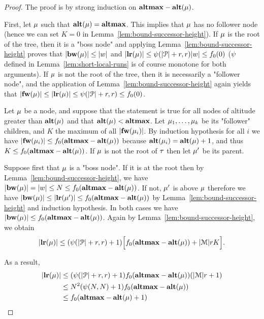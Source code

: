 \begin{proof}
	The proof is by strong induction on $\mathbf{altmax}-\mathbf{alt}(\mu)$.

	First, let $\mu$ such that $\mathbf{alt}(\mu) = \mathbf{altmax}$. This implies that $\mu$ has no follower node (hence we can set $K=0$ in Lemma~\ref{lem:bound-successor-height}).  If $\mu$ is the root of the tree, then it is a "boss node" and applying Lemma~\ref{lem:bound-successor-height} proves that $|\mathbf{bw}(\mu)| \leq |w|$ and $|\mathbf{lr}(\mu)| \leq \psi(|\mathcal{P}|+r,r) |w| \leq f_0(0)$ ($\psi$ defined in Lemma~\ref{lem:short-local-runs} is of course monotone for both arguments). If $\mu$ is not the root of the tree, then it is necessarily a "follower node", and the application of Lemma~\ref{lem:bound-successor-height} again yields that $|\mathbf{fw}(\mu)| \leq |\mathbf{lr}(\mu)| \leq \psi(|\mathcal{P}|+r,r) \leq f_0(0)$.   

	Let $\mu$ be a node, and suppose that the statement is true for all nodes of altitude greater than $\mathbf{alt}(\mu)$ and that $\mathbf{alt}(\mu) < \mathbf{altmax}$. 
	Let $\mu_1, \ldots, \mu_k$ be its "follower" children, and $K$ the maximum of all $|\mathbf{fw}(\mu_i)|$.  By induction hypothesis for all $i$ we have 
	$|\mathbf{fw}(\mu_i)| \leq f_0(\mathbf{altmax}-\mathbf{alt}(\mu))$ because $\mathbf{alt}(\mu_i) = \mathbf{alt}(\mu)+1$, and thus $K \leq f_0(\mathbf{altmax}-\mathbf{alt}(\mu))$. If $\mu$ is not the root of $\tau$ then let $\mu'$ be its parent.
	
	Suppose first that $\mu$ is a "boss node". If it is at the root then by Lemma~\ref{lem:bound-successor-height}, we have $|\mathbf{bw}(\mu)| = |w| \leq N \leq f_0(\mathbf{altmax} - \mathbf{alt}(\mu))$. If not, $\mu'$ is above $\mu$ therefore we have $|\mathbf{bw}(\mu)| \leq |\mathbf{lr}(\mu')| \leq f_0(\mathbf{altmax} - \mathbf{alt}(\mu))$ by Lemma~\ref{lem:bound-successor-height} and induction hypothesis. In both cases we have $|\mathbf{bw}(\mu)| \leq f_0(\mathbf{altmax} - \mathbf{alt}(\mu))$.	
	Again by Lemma~\ref{lem:bound-successor-height}, we obtain \[|\mathbf{lr}(\mu)| \leq (\psi(|\mathcal{P}|+r,r)+1) \Big[f_0(\mathbf{altmax}-\mathbf{alt}(\mu)) + |\mathcal{M}|rK\Big]. \]
	
	 As a result, 
	\begin{align*}
	|\mathbf{lr}(\mu)|& 
	\leq (\psi(|\mathcal{P}|+r,r)+1) f_0(\mathbf{altmax}-\mathbf{alt}(\mu))(|\mathcal{M}| r +1) \\&  
	\leq N^2(\psi(N,N) +1) f_0(\mathbf{altmax} - \mathbf{alt}(\mu)) \\& 
	\leq f_0(\mathbf{altmax} - \mathbf{alt}(\mu)+1)
	\end{align*}
	

\end{proof}

